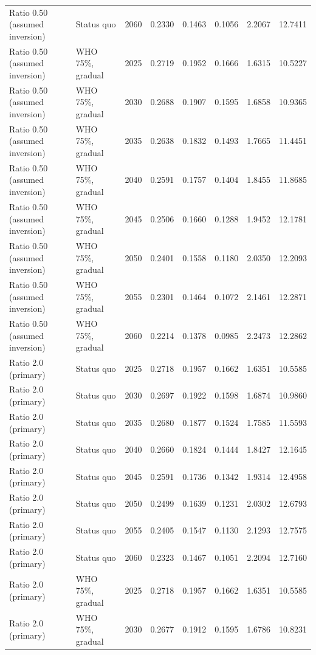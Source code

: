 \begin{longtable}{llrrrrrr}
Ratio 0.50 (assumed inversion) & Status quo & 2060 & 0.2330 & 0.1463 & 0.1056 & 2.2067 & 12.7411 \\
Ratio 0.50 (assumed inversion) & WHO 75\%, gradual & 2025 & 0.2719 & 0.1952 & 0.1666 & 1.6315 & 10.5227 \\
Ratio 0.50 (assumed inversion) & WHO 75\%, gradual & 2030 & 0.2688 & 0.1907 & 0.1595 & 1.6858 & 10.9365 \\
Ratio 0.50 (assumed inversion) & WHO 75\%, gradual & 2035 & 0.2638 & 0.1832 & 0.1493 & 1.7665 & 11.4451 \\
Ratio 0.50 (assumed inversion) & WHO 75\%, gradual & 2040 & 0.2591 & 0.1757 & 0.1404 & 1.8455 & 11.8685 \\
Ratio 0.50 (assumed inversion) & WHO 75\%, gradual & 2045 & 0.2506 & 0.1660 & 0.1288 & 1.9452 & 12.1781 \\
Ratio 0.50 (assumed inversion) & WHO 75\%, gradual & 2050 & 0.2401 & 0.1558 & 0.1180 & 2.0350 & 12.2093 \\
Ratio 0.50 (assumed inversion) & WHO 75\%, gradual & 2055 & 0.2301 & 0.1464 & 0.1072 & 2.1461 & 12.2871 \\
Ratio 0.50 (assumed inversion) & WHO 75\%, gradual & 2060 & 0.2214 & 0.1378 & 0.0985 & 2.2473 & 12.2862 \\
Ratio 2.0 (primary) & Status quo & 2025 & 0.2718 & 0.1957 & 0.1662 & 1.6351 & 10.5585 \\
Ratio 2.0 (primary) & Status quo & 2030 & 0.2697 & 0.1922 & 0.1598 & 1.6874 & 10.9860 \\
Ratio 2.0 (primary) & Status quo & 2035 & 0.2680 & 0.1877 & 0.1524 & 1.7585 & 11.5593 \\
Ratio 2.0 (primary) & Status quo & 2040 & 0.2660 & 0.1824 & 0.1444 & 1.8427 & 12.1645 \\
Ratio 2.0 (primary) & Status quo & 2045 & 0.2591 & 0.1736 & 0.1342 & 1.9314 & 12.4958 \\
Ratio 2.0 (primary) & Status quo & 2050 & 0.2499 & 0.1639 & 0.1231 & 2.0302 & 12.6793 \\
Ratio 2.0 (primary) & Status quo & 2055 & 0.2405 & 0.1547 & 0.1130 & 2.1293 & 12.7575 \\
Ratio 2.0 (primary) & Status quo & 2060 & 0.2323 & 0.1467 & 0.1051 & 2.2094 & 12.7160 \\
Ratio 2.0 (primary) & WHO 75\%, gradual & 2025 & 0.2718 & 0.1957 & 0.1662 & 1.6351 & 10.5585 \\
Ratio 2.0 (primary) & WHO 75\%, gradual & 2030 & 0.2677 & 0.1912 & 0.1595 & 1.6786 & 10.8231 \\

\end{longtable}
